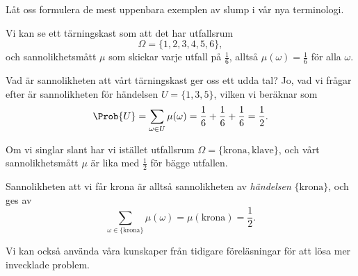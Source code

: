 \documentclass[nobib]{tufte-handout}
\begin{document}
\begin{example}
    Låt oss formulera de mest uppenbara exemplen av slump i vår nya terminologi.

    Vi kan se ett tärningskast som att det har utfallsrum 
    $$\Omega = \{1,2,3,4,5,6\},$$
    och sannolikhetsmått $\mu$ som skickar varje utfall på $\frac{1}{6}$, alltså $\mu(\omega) = \frac{1}{6}$ för alla $\omega$.

    Vad är sannolikheten att vårt tärningskast ger oss ett udda tal? Jo, vad vi frågar efter är sannolikheten för händelsen $U = \{1,3,5\}$, vilken vi beräknar som
    $$\Prob{U} = \sum_{\omega \in U} \mu(\omega) = \frac{1}{6} + \frac{1}{6} + \frac{1}{6} = \frac{1}{2}.$$

    Om vi singlar slant har vi istället utfallsrum $\Omega = \{\text{krona}, \text{klave}\}$, och vårt sannolikhetsmått $\mu$ är lika med $\frac{1}{2}$ för bägge utfallen.

    Sannolikheten att vi får krona är alltså sannolikheten av \emph{händelsen} $\{\text{krona}\}$, och ges av
    $$\sum_{\omega \in \{\text{krona}\}} \mu(\omega) = \mu(\text{krona}) = \frac{1}{2}.$$
\end{example}

Vi kan också använda våra kunskaper från tidigare föreläsningar för att lösa mer invecklade problem.
\end{document}
